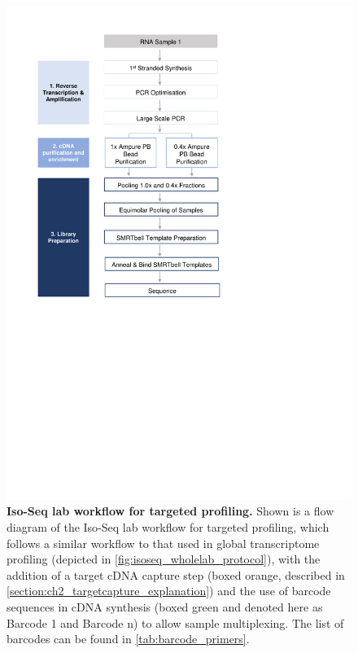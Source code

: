 \begin{figure}[]
	\begin{center}
		\includegraphics[page=2,trim={1cm 11cm 1cm 1cm},clip,scale = 0.8]{Figures/ProjectDevelopment_Figures.pdf}
	\end{center}
	\captionsetup{width=0.95\textwidth}
	\caption[Iso-Seq lab workflow for targeted profiling]%
	{\textbf{Iso-Seq lab workflow for targeted profiling.} Shown is a flow diagram of the Iso-Seq lab workflow for targeted profiling, which follows a similar workflow to that used in global transcriptome profiling (depicted in \cref{fig:isoseq_wholelab_protocol}), with the addition of a target cDNA capture step (boxed orange, described in \cref{section:ch2_targetcapture_explanation}) and the use of barcode sequences in cDNA synthesis (boxed green and denoted here as Barcode 1 and Barcode n) to allow sample multiplexing. The list of barcodes can be found in \cref{tab:barcode_primers}.}
	\label{fig:isoseq_targetedlab_protocol}
\end{figure}

